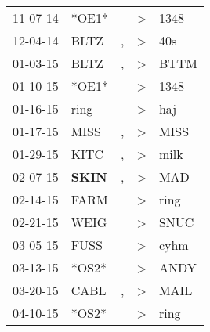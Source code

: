 \begin{supertabular}{p{0.07\textwidth}p{0.06\textwidth}p{0.02\textwidth}p{0.02\textwidth}p{0.06\textwidth}}
          11-07-14\textsuperscript{} &                            *OE1* &                  &     \textgreater &           1348\textsuperscript{} \\
          12-04-14\textsuperscript{} &           BLTZ\textsuperscript{} &                , &     \textgreater &            40s\textsuperscript{} \\
          01-03-15\textsuperscript{} &           BLTZ\textsuperscript{} &                , &     \textgreater &           BTTM\textsuperscript{} \\
          01-10-15\textsuperscript{} &                            *OE1* &                  &     \textgreater &           1348\textsuperscript{} \\
          01-16-15\textsuperscript{} &           ring\textsuperscript{} &                  &     \textgreater &            haj\textsuperscript{} \\
          01-17-15\textsuperscript{} &           MISS\textsuperscript{} &                , &     \textgreater &           MISS\textsuperscript{} \\
          01-29-15\textsuperscript{} &           KITC\textsuperscript{} &                , &     \textgreater &           milk\textsuperscript{} \\
          02-07-15\textsuperscript{} &  \textbf{SKIN\textsuperscript{}} &                , &     \textgreater &            MAD\textsuperscript{} \\
          02-14-15\textsuperscript{} &           FARM\textsuperscript{} &                  &     \textgreater &           ring\textsuperscript{} \\
          02-21-15\textsuperscript{} &           WEIG\textsuperscript{} &                  &     \textgreater &           SNUC\textsuperscript{} \\
          03-05-15\textsuperscript{} &           FUSS\textsuperscript{} &                  &     \textgreater &           cyhm\textsuperscript{} \\
          03-13-15\textsuperscript{} &                            *OS2* &                  &     \textgreater &           ANDY\textsuperscript{} \\
          03-20-15\textsuperscript{} &           CABL\textsuperscript{} &                , &     \textgreater &           MAIL\textsuperscript{} \\
          04-10-15\textsuperscript{} &                            *OS2* &                  &     \textgreater &           ring\textsuperscript{} \\

\end{supertabular}
